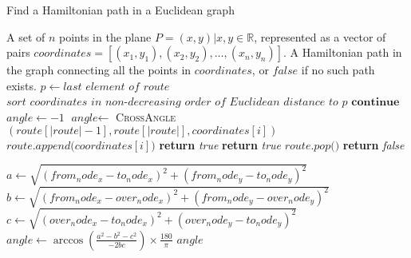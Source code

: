 \documentclass[a4paper,10pt,ngerman]{scrartcl}
\begin{document}
\begin{algorithm}
    \caption{Find a Hamiltonian path in a Euclidean graph}
    \begin{algorithmic}
        \Require A set of $n$ points in the plane $P={(x,y)| x,y \in \mathbb{R}}$, represented as a vector of pairs $\textit{coordinates}=[(x_1,y_1), (x_2,y_2),\dots, (x_n,y_n)]$.
        \Ensure A Hamiltonian path in the graph connecting all the points in $\textit{coordinates}$, or $\textit{false}$ if no such path exists.
                \State $p\gets \textit{last element of } \textit{route}$
                \State $\textit{sort } \textit{coordinates } \textit{in non-decreasing order of Euclidean distance to } p$
            \EndIf
                    \State $\textbf{continue}$
                \EndIf
                \State $\textit{angle}\gets -1$
                    \State $\textit{angle}\gets$ \textsc{CrossAngle}$(\textit{route}[|\textit{route}|-1], \textit{route}[|\textit{route}|], \textit{coordinates}[i])$
                \EndIf
                    \State $\textit{route.append(}\textit{coordinates}[i]\textit{)}$
                        \State \textbf{return} \textit{true}
                    \EndIf
                        \State \textbf{return} \textit{true}
                    \Else
                        \State $\textit{route.pop()}$
                    \EndIf
                \EndIf
            \EndFor
            \State \textbf{return} \textit{false}
        \EndFunction
    \end{algorithmic}
            \begin{algorithmic}
 \State $\textit{a}\gets \sqrt{(from_node_x - to_node_x)^2 + (from_node_y - to_node_y)^2}$
            \State $\textit{b}\gets \sqrt{(from_node_x - over_node_x)^2 + (from_node_y - over_node_y)^2}$
            \State $\textit{c}\gets \sqrt{(over_node_x - to_node_x)^2 + (over_node_y - to_node_y)^2}$
            \State $\textit{angle} \gets \arccos\left(\frac{a^2 - b^2 - c^2}{-2bc}\right) \times \frac{180}{\pi}$
            \State \Return $angle$
            \EndFunction
\end{algorithmic}
    \end{algorithm}
\end{document}
